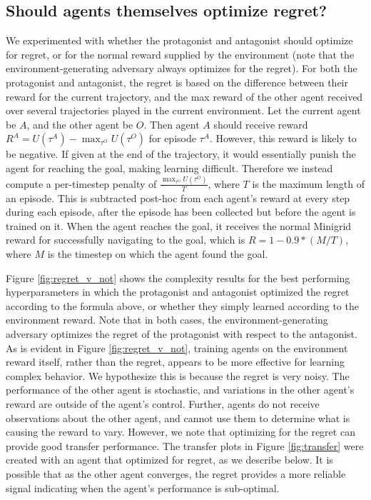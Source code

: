 \documentclass{article}
\begin{document}
\begin{appendix}
\subsection{Should agents themselves optimize regret?}
We experimented with whether the protagonist and antagonist should optimize for regret, or for the normal reward supplied by the environment (note that the environment-generating adversary always optimizes for the regret). For both the protagonist and antagonist, the regret is based on the difference between their reward for the current trajectory, and the max reward of the other agent received over several trajectories played in the current environment. Let the current agent be $A$, and the other agent be $O$. Then agent $A$ should receive reward $R^A = U(\tau^A) - \max_{\tau^O} U(\tau^O)$ for episode $\tau^A$. However, this reward is likely to be negative. If given at the end of the trajectory, it would essentially punish the agent for reaching the goal, making learning difficult. Therefore we instead compute a per-timestep penalty of $\frac{\max_{\tau^O} U(\tau^O)}{T}$, where $T$ is the maximum length of an episode. This is subtracted post-hoc from each agent's reward at every step during each episode, after the episode has been collected but before the agent is trained on it. When the agent reaches the goal, it receives the normal Minigrid reward for successfully navigating to the goal, which is $R = 1 - 0.9 * (M / T)$, where $M$ is the timestep on which the agent found the goal. 

Figure \ref{fig:regret_v_not} shows the complexity results for the best performing hyperparameters in which the protagonist and antagonist optimized the regret according to the formula above, or whether they simply learned according to the environment reward. Note that in both cases, the environment-generating adversary optimizes the regret of the protagonist with respect to the antagonist. As is evident in Figure \ref{fig:regret_v_not}, training agents on the environment reward itself, rather than the regret, appears to be more effective for learning complex behavior. We hypothesize this is because the regret is very noisy. The performance of the other agent is stochastic, and variations in the other agent's reward are outside of the agent's control. Further, agents do not receive observations about the other agent, and cannot use them to determine what is causing the reward to vary. However, we note that optimizing for the regret can provide good transfer performance. The transfer plots in Figure \ref{fig:transfer} were created with an agent that optimized for regret, as we describe below. It is possible that as the other agent converges, the regret provides a more reliable signal indicating when the agent's performance is sub-optimal.


\end{appendix}
\end{document}
